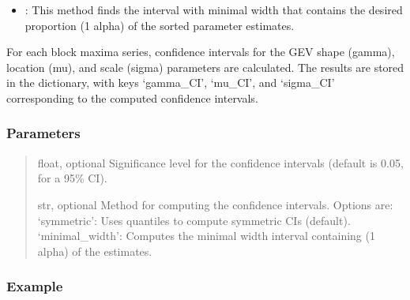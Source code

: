 \documentclass[a4paper,11pt,openany,english]{sphinxmanual}
\begin{document}
\begin{fulllineitems}
\begin{fulllineitems}
\begin{itemize}
\item {} 
\sphinxAtStartPar
{}: This method finds the interval with minimal width that contains the desired proportion (1 \sphinxhyphen{} alpha) of the sorted parameter estimates.

\end{itemize}

\sphinxAtStartPar
For each block maxima series, confidence intervals for the GEV shape (gamma), location (mu), and scale (sigma) parameters are calculated. The results 
are stored in the  dictionary, with keys ‘gamma\_CI’, ‘mu\_CI’, and ‘sigma\_CI’ corresponding to the computed confidence intervals.


\subsubsection{Parameters}
\label{\detokenize{api_topt:id29}}\begin{quote}\begin{description}
\sphinxAtStartPar
float, optional
Significance level for the confidence intervals (default is 0.05, for a 95\% CI).

\sphinxAtStartPar
str, optional
Method for computing the confidence intervals. Options are:
\sphinxhyphen{} ‘symmetric’: Uses quantiles to compute symmetric CIs (default).
\sphinxhyphen{} ‘minimal\_width’: Computes the minimal width interval containing (1 \sphinxhyphen{} alpha) of the estimates.

\end{description}\end{quote}


\subsubsection{Example}
\label{\detokenize{api_topt:id30}}
\begin{sphinxVerbatim}[commandchars=\\\{\}]
  
 
\end{sphinxVerbatim}



\end{fulllineitems}
\end{fulllineitems}
\end{document}
